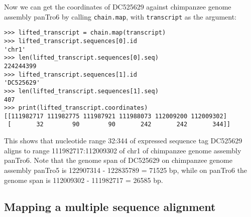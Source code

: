 Now we can get the coordinates of DC525629 against chimpanzee genome assembly panTro6 by calling \verb|chain.map|, with \verb|transcript| as the argument:
\begin{verbatim}
>>> lifted_transcript = chain.map(transcript)
>>> lifted_transcript.sequences[0].id
'chr1'
>>> len(lifted_transcript.sequences[0].seq)
224244399
>>> lifted_transcript.sequences[1].id
'DC525629'
>>> len(lifted_transcript.sequences[1].seq)
407
>>> print(lifted_transcript.coordinates)
[[111982717 111982775 111987921 111988073 112009200 112009302]
 [       32        90        90       242       242       344]]
\end{verbatim}
This shows that nucleotide range 32:344 of expressed sequence tag DC525629 aligns to range 111982717:112009302 of chr1 of chimpanzee genome assembly panTro6. Note that the genome span of DC525629 on chimpanzee genome assembly panTro5 is 122907314 - 122835789 = 71525 bp, while on panTro6 the genome span is 112009302 - 111982717 = 26585 bp.

\subsection{Mapping a multiple sequence alignment}

